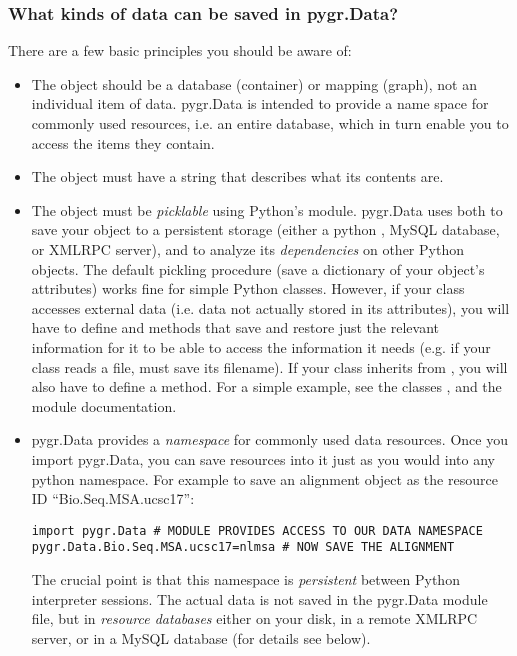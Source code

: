 \documentclass{howto}
\begin{document}
\subsubsection{What kinds of data can be saved in pygr.Data?}
There are a few basic principles you should be aware of:
\begin{itemize}
\item The object should be a database (container) or mapping (graph),
not an individual item of data.  pygr.Data is intended to provide
a name space for commonly used resources, i.e. an entire database,
which in turn enable you to access the items they contain.

\item The object must have a  string that describes
what its contents are.

\item The object must be {\em picklable} using Python's 
module.  pygr.Data uses  both to save your object to 
a persistent storage (either a python , MySQL database,
or XMLRPC server), and to analyze its {\em dependencies} on other
Python objects.  The default pickling procedure (save a dictionary of
your object's attributes) works fine for simple Python classes.
However, if your class accesses external data (i.e. data not actually
stored in its attributes), you will have to define 
and  methods that save and restore just the 
relevant information for it to be able to access the information
it needs (e.g. if your class reads a file,  must
save its filename).  If your class inherits from , you
will also have to define a  method.  For a simple
example, see the classes , and the  module documentation.

\item pygr.Data provides a {\em namespace} for commonly used data resources.
Once you import pygr.Data, you can save resources into it just as you would into
any python namespace.  For example to save an alignment object 
as the resource ID ``Bio.Seq.MSA.ucsc17'':
\begin{verbatim}
import pygr.Data # MODULE PROVIDES ACCESS TO OUR DATA NAMESPACE
pygr.Data.Bio.Seq.MSA.ucsc17=nlmsa # NOW SAVE THE ALIGNMENT
\end{verbatim}
The crucial point is that this namespace is {\em persistent} between
Python interpreter sessions.  The actual data is not saved in the pygr.Data 
module file, but in {\em resource databases} either on your disk, in
a remote XMLRPC server, or in a MySQL database (for details see below).


\end{itemize}
\end{document}
